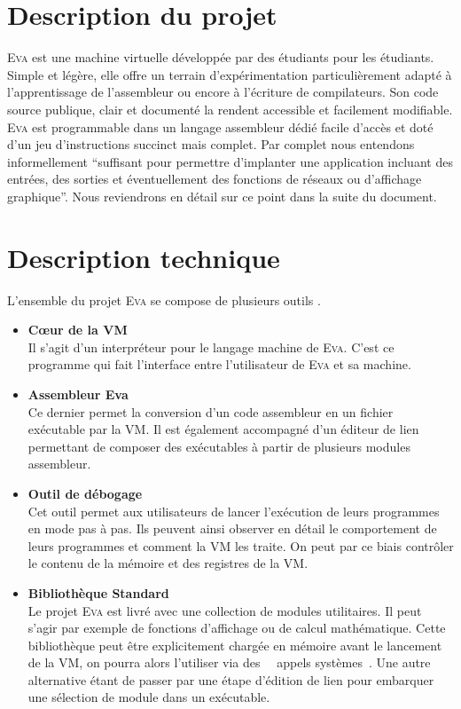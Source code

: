\documentclass[11pt,twoside]{article}
\makeatletter
\providecommand{\og}{\leavevmode\flqq~}%
\providecommand{\fg}{\ifdim\lastskip>\z@\unskip\fi~\frqq}%
\newcommand{\noun}[1]{\textsc{#1}}
\makeatother
\begin{document}
\vfill
\hspace{0pt}
\newpage{}

\section{Description du projet}

\noun{Eva} est une machine virtuelle développée par des étudiants pour les
étudiants. Simple et légère, elle offre un terrain d'expérimentation
particulièrement adapté à l'apprentissage de l'assembleur ou encore
à l'écriture de compilateurs. Son code source publique, clair et documenté
la rendent accessible et facilement modifiable. \noun{Eva} est programmable
dans un langage assembleur dédié facile d'accès et doté d'un jeu d'instructions
succinct mais complet. Par complet nous entendons informellement ``suffisant pour permettre d'implanter une application incluant des entrées, des sorties et éventuellement des fonctions de réseaux ou d'affichage graphique''. Nous reviendrons en détail sur ce point dans la suite du document.

\section{Description technique}

L'ensemble du projet \noun{Eva} se compose de plusieurs outils .

\begin{itemize}
  \item \textbf{Cœur de la VM} \\
        Il s'agit d'un interpréteur pour le langage machine de \noun{Eva}. C'est ce programme qui fait l'interface entre l'utilisateur de \noun{Eva} et sa machine.

  \item \textbf{Assembleur Eva} \\
        Ce dernier permet la conversion d'un code assembleur en un fichier exécutable par la VM. Il est également accompagné d'un éditeur de lien permettant de composer des exécutables à partir de plusieurs modules assembleur.

  \item \textbf{Outil de débogage} \\
        Cet outil permet aux utilisateurs de lancer l’exécution de leurs programmes en mode pas à pas. Ils peuvent ainsi observer en détail le comportement de leurs programmes et comment la VM les traite. On peut par ce biais contrôler le contenu de la mémoire et des registres de la VM.


  \item \textbf{Bibliothèque Standard} \\
        Le projet \noun{Eva} est livré avec une collection de modules utilitaires. Il peut s'agir par exemple de fonctions d'affichage ou de calcul mathématique. Cette bibliothèque peut être explicitement chargée en mémoire avant le lancement de la VM, on pourra alors l'utiliser via des \og~appels systèmes\fg. Une autre alternative étant de passer par une étape d'édition de lien pour embarquer une sélection de module dans un exécutable.

\end{itemize}
\end{document}
